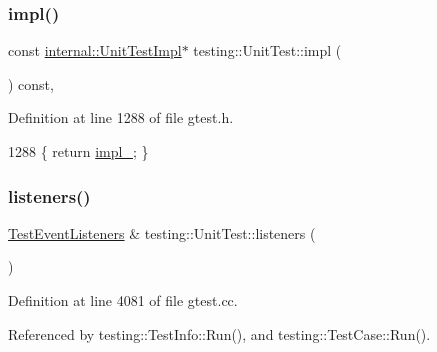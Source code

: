 \subsubsection{\texorpdfstring{impl()}{impl()}\hspace{0.1cm}{\footnotesize\ttfamily [2/2]}}
{\footnotesize\ttfamily const \hyperlink{classtesting_1_1internal_1_1UnitTestImpl}{internal\+::\+Unit\+Test\+Impl}$\ast$ testing\+::\+Unit\+Test\+::impl (\begin{DoxyParamCaption}{ }\end{DoxyParamCaption}) const\hspace{0.3cm}{\ttfamily [inline]}, {\ttfamily [private]}}



Definition at line 1288 of file gtest.\+h.


\begin{DoxyCode}
1288 \{ \textcolor{keywordflow}{return} \hyperlink{classtesting_1_1UnitTest_a834685f92009d21b21a7307f4cbfb6e5}{impl\_}; \}
\end{DoxyCode}
\mbox{\label{classtesting_1_1UnitTest_aac10085cf7c0d1751306db10cdd953cb}} 
\subsubsection{\texorpdfstring{listeners()}{listeners()}}
{\footnotesize\ttfamily \hyperlink{classtesting_1_1TestEventListeners}{Test\+Event\+Listeners} \& testing\+::\+Unit\+Test\+::listeners (\begin{DoxyParamCaption}{ }\end{DoxyParamCaption})}



Definition at line 4081 of file gtest.\+cc.



Referenced by testing\+::\+Test\+Info\+::\+Run(), and testing\+::\+Test\+Case\+::\+Run().


